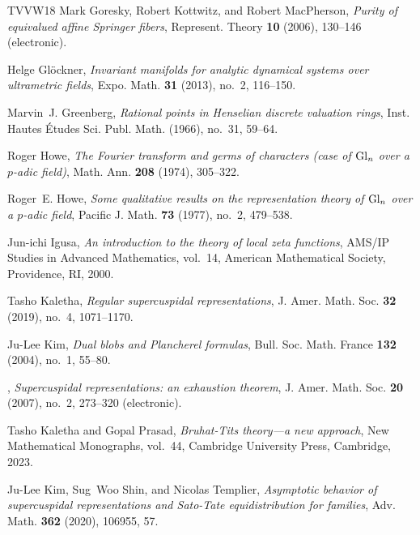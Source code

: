 \documentclass[11pt,reqno]{amsart}
\numberwithin{equation}{section}
\theoremstyle{plain}
\theoremstyle{definition}
\theoremstyle{remark}
\theoremstyle{plain}
\begin{document}
\begin{thebibliography}{TVVW18}
Mark Goresky, Robert Kottwitz, and Robert MacPherson, \emph{Purity of
  equivalued affine {S}pringer fibers}, Represent. Theory \textbf{10} (2006),
  130--146 (electronic). 

Helge Gl\"{o}ckner, \emph{Invariant manifolds for analytic dynamical systems
  over ultrametric fields}, Expo. Math. \textbf{31} (2013), no.~2, 116--150.

Marvin~J. Greenberg, \emph{Rational points in {H}enselian discrete valuation
  rings}, Inst. Hautes \'Etudes Sci. Publ. Math. (1966), no.~31, 59--64.

Roger Howe, \emph{The {F}ourier transform and germs of characters (case of
  {${\rm Gl}_{n}$} over a {$p$}-adic field)}, Math. Ann. \textbf{208} (1974),
  305--322. 

Roger~E. Howe, \emph{Some qualitative results on the representation theory of
  {${\rm Gl}_{n}$} over a {$p$}-adic field}, Pacific J. Math. \textbf{73}
  (1977), no.~2, 479--538. 

Jun-ichi Igusa, \emph{An introduction to the theory of local zeta functions},
  AMS/IP Studies in Advanced Mathematics, vol.~14, American Mathematical
  Society, Providence, RI, 2000. 

Tasho Kaletha, \emph{Regular supercuspidal representations}, J. Amer. Math.
  Soc. \textbf{32} (2019), no.~4, 1071--1170. 

Ju-Lee Kim, \emph{Dual blobs and {P}lancherel formulas}, Bull. Soc. Math.
  France \textbf{132} (2004), no.~1, 55--80. 

\bysame, \emph{Supercuspidal representations: an exhaustion theorem}, J. Amer.
  Math. Soc. \textbf{20} (2007), no.~2, 273--320 (electronic). 

Tasho Kaletha and Gopal Prasad, \emph{Bruhat-{T}its theory---a new approach},
  New Mathematical Monographs, vol.~44, Cambridge University Press, Cambridge,
  2023. 

Ju-Lee Kim, Sug~Woo Shin, and Nicolas Templier, \emph{Asymptotic behavior of
  supercuspidal representations and {S}ato-{T}ate equidistribution for
  families}, Adv. Math. \textbf{362} (2020), 106955, 57. 


\end{thebibliography}
\end{document}
